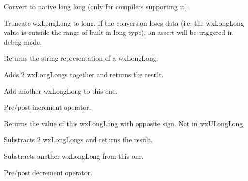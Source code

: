 \label{wxlonglonggetvalue}


Convert to native long long (only for compilers supporting it)

\label{wxlonglongtolong}


Truncate wxLongLong to long. If the conversion loses data (i.e. the wxLongLong
value is outside the range of built-in long type), an assert will be triggered
in debug mode.

\label{wxlonglongtostring}


Returns the string representation of a wxLongLong.

\label{wxlonglongoperatorplus}


Adds 2 wxLongLongs together and returns the result.

\label{wxlonglongoperatorplusassign}


Add another wxLongLong to this one.

\label{wxlonglongoperatorinc}



Pre/post increment operator.

\label{wxlonglongoperatorunaryminus}


Returns the value of this wxLongLong with opposite sign.  Not in wxULongLong.

\label{wxlonglongoperatorminus}


Substracts 2 wxLongLongs and returns the result.

\label{wxlonglongoperatorminusassign}


Substracts another wxLongLong from this one.

\label{wxlonglongoperatordec}



Pre/post decrement operator.


